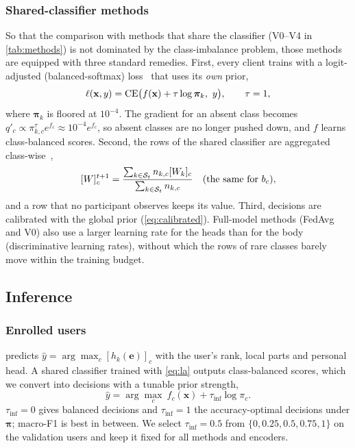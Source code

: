 \subsubsection{Shared-classifier methods}
So that the comparison with methods that share the classifier (V0--V4 in \cref{tab:methods}) is
not dominated by the class-imbalance problem, those methods are equipped with three standard
remedies. First, every client trains with a logit-adjusted (balanced-softmax)
loss~\cite{menon2021logit,ren2020balanced,zhang2022fedlc} that uses its \emph{own} prior,
\begin{equation}\label{eq:la}
  \ell(\mathbf{x},y)=\CE\big(f(\mathbf{x})+\tau\log\boldsymbol{\pi}_k,\ y\big),\qquad\tau=1,
\end{equation}
where $\boldsymbol{\pi}_k$ is floored at $10^{-4}$. The gradient for an absent class becomes
$q'_c\propto\pi_{k,c}^{\tau}e^{f_c}\approx 10^{-4}e^{f_c}$, so absent classes are no longer pushed
down, and $f$ learns class-balanced scores. Second, the rows of the shared classifier are
aggregated class-wise~\cite{li2021fedrs,shang2022creff},
\begin{equation}\label{eq:classwise}
  [W]_c^{t+1}=\frac{\sum_{k\in\mathcal{S}_t}n_{k,c}[W_k]_c}{\sum_{k\in\mathcal{S}_t}n_{k,c}}\quad\text{(the same for $b_c$)},
\end{equation}
and a row that no participant observes keeps its value. Third, decisions are calibrated with
the global prior (\cref{eq:calibrated}). Full-model methods (FedAvg and V0) also use a larger
learning rate for the heads than for the body (discriminative learning rates), without which
the rows of rare classes barely move within the training budget.

\subsection{Inference}\label{sec:method:inference}

\subsubsection{Enrolled users}
\method{} predicts $\hat{y}=\arg\max_c[h_k(\mathbf{e})]_c$ with the user's rank, local parts and
personal head. A shared classifier trained with \cref{eq:la} outputs class-balanced scores, which
we convert into decisions with a tunable prior strength,
\begin{equation}\label{eq:calibrated}
  \hat{y}=\arg\max_c\ f_c(\mathbf{x})+\tau_{\mathrm{inf}}\log\pi_c .
\end{equation}
$\tau_{\mathrm{inf}}=0$ gives balanced decisions and $\tau_{\mathrm{inf}}=1$ the accuracy-optimal
decisions under $\boldsymbol{\pi}$; macro-F1 is best in between. We select
$\tau_{\mathrm{inf}}=0.5$ from $\{0,0.25,0.5,0.75,1\}$ on the validation users and keep it fixed for all
methods and encoders.

